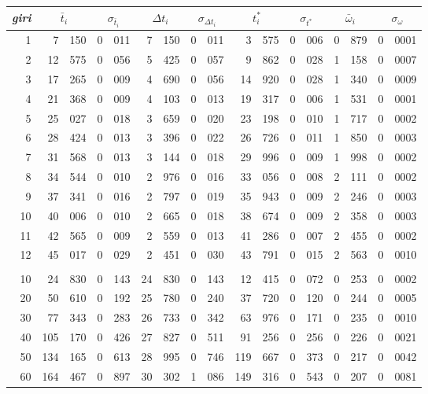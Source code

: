 \begin{tabular}{r *{8}{r@{.}l}}
\emph{giri}
&\multicolumn{2}{c}{$\bar{t}_i$}
&\multicolumn{2}{c}{$\sigma_{\bar{t}_i}$}
&\multicolumn{2}{c}{$\Delta t_i$}
&\multicolumn{2}{c}{$\sigma_{\Delta t_i}$}
&\multicolumn{2}{c}{$t^\ast_i$}
&\multicolumn{2}{c}{$\sigma_{t^\ast}$}
&\multicolumn{2}{c}{$\bar{\omega}_i$}
&\multicolumn{2}{c}{$\sigma_{\omega}$}\\\hline
1 &7&150 &0&011 &7&150 &0&011 &3&575 &0&006 &0&879 &0&0001\\
2 &12&575 &0&056 &5&425 &0&057 &9&862 &0&028 &1&158 &0&0007\\
3 &17&265 &0&009 &4&690 &0&056 &14&920 &0&028 &1&340 &0&0009\\
4 &21&368 &0&009 &4&103 &0&013 &19&317 &0&006 &1&531 &0&0001\\
5 &25&027 &0&018 &3&659 &0&020 &23&198 &0&010 &1&717 &0&0002\\
6 &28&424 &0&013 &3&396 &0&022 &26&726 &0&011 &1&850 &0&0003\\
7 &31&568 &0&013 &3&144 &0&018 &29&996 &0&009 &1&998 &0&0002\\
8 &34&544 &0&010 &2&976 &0&016 &33&056 &0&008 &2&111 &0&0002\\
9 &37&341 &0&016 &2&797 &0&019 &35&943 &0&009 &2&246 &0&0003\\
10 &40&006 &0&010 &2&665 &0&018 &38&674 &0&009 &2&358 &0&0003\\
11 &42&565 &0&009 &2&559 &0&013 &41&286 &0&007 &2&455 &0&0002\\
12 &45&017 &0&029 &2&451 &0&030 &43&791 &0&015 &2&563 &0&0010\\
\\
10 &24&830 &0&143 &24&830 &0&143 &12&415 &0&072 &0&253 &0&0002\\
20 &50&610 &0&192 &25&780 &0&240 &37&720 &0&120 &0&244 &0&0005\\
30 &77&343 &0&283 &26&733 &0&342 &63&976 &0&171 &0&235 &0&0010\\
40 &105&170 &0&426 &27&827 &0&511 &91&256 &0&256 &0&226 &0&0021\\
50 &134&165 &0&613 &28&995 &0&746 &119&667 &0&373 &0&217 &0&0042\\
60 &164&467 &0&897 &30&302 &1&086 &149&316 &0&543 &0&207 &0&0081
\end{tabular}